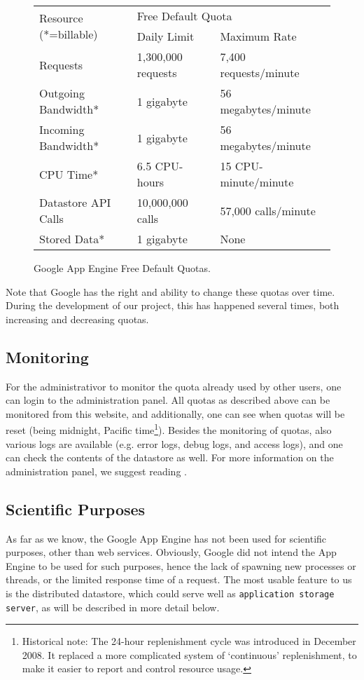 \begin{figure}[h,t]
\begin{center}
\begin{tabular}{| l | l | l | }
\hline
\multirow{2}{*}{Resource (*=billable)} & \multicolumn{2}{|l|}{Free Default
Quota} \\
\cline{2-3}
& Daily Limit & Maximum Rate \\
\hline
Requests & 1,300,000 requests & 7,400 requests/minute \\
\hline
Outgoing Bandwidth* & 1 gigabyte & 56 megabytes/minute \\ 
\hline
Incoming Bandwidth* & 1 gigabyte & 56 megabytes/minute \\
\hline
CPU Time* & 6.5 CPU-hours & 15 CPU-minute/minute \\
\hline
Datastore API Calls & 10,000,000 calls & 57,000 calls/minute \\
\hline
Stored Data* & 1 gigabyte & None \\
\hline
\end{tabular}
\caption{Google App Engine Free Default Quotas. \label{quota-table}}
\end{center}
\end{figure}

Note that Google has the right and ability to change these quotas over time.
During the development of our project, this has happened several times, both
increasing and decreasing quotas.

\subsection{Monitoring}
For the administrativor to monitor the quota already used by other users, one can
login to the administration panel. All quotas as described above can be monitored
from this website, and additionally, one can see when quotas will be reset (being
midnight, Pacific time\footnote{Historical note: The 24-hour replenishment cycle
was introduced in December 2008. It replaced a more complicated system of
`continuous' replenishment, to make it easier to report and control resource
usage.}).  Besides the monitoring of quotas, also various logs are available
(e.g. error logs, debug logs, and access logs), and one can check the contents of
the datastore as well. For more information on the administration panel, we
suggest reading \cite{app-engine-admin}.

\subsection{Scientific Purposes}
As far as we know, the Google App Engine has not been used for scientific
purposes, other than web services. Obviously, Google did not intend the App
Engine to be used for such purposes, hence the lack of spawning new processes
or threads, or the limited response time of a request. The most usable feature
to us is the distributed datastore, which could serve well as
\texttt{application storage server}, as will be described in more detail below.
